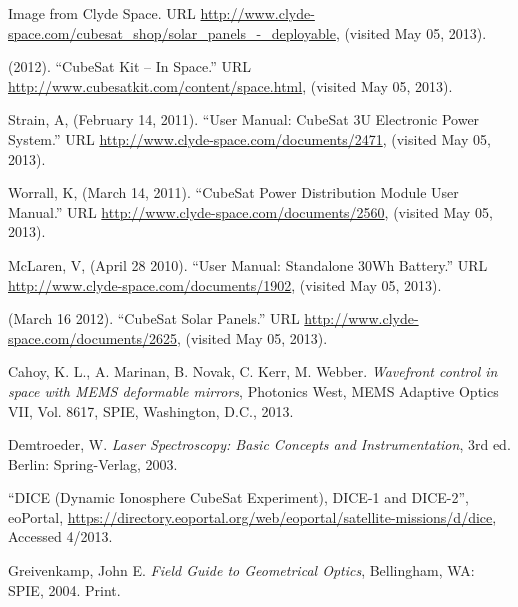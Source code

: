 \documentclass[12pt]{article}
\begin{document}
\begin{thebibliography}{9}








Image from Clyde Space.  URL \url{http://www.clyde-space.com/cubesat_shop/solar_panels_-_deployable}, (visited May 05, 2013).

 (2012).  ``CubeSat Kit -- In Space.''  URL \url{http://www.cubesatkit.com/content/space.html}, (visited May 05, 2013).

 Strain, A, (February 14, 2011).  ``User Manual: CubeSat 3U Electronic Power System.'' URL \url{http://www.clyde-space.com/documents/2471}, (visited May 05, 2013).

 Worrall, K, (March 14, 2011).  ``CubeSat Power Distribution Module User Manual.'' URL \url{http://www.clyde-space.com/documents/2560}, (visited May 05, 2013).

 McLaren, V, (April 28 2010).  ``User Manual: Standalone 30Wh Battery.''  URL \url{http://www.clyde-space.com/documents/1902}, (visited May 05, 2013).

 (March 16 2012). ``CubeSat Solar Panels.''  URL \url{http://www.clyde-space.com/documents/2625}, (visited May 05, 2013).



   Cahoy, K. L., A. Marinan, B. Novak, C. Kerr, M. Webber. 
   \emph{Wavefront control in space with MEMS deformable mirrors}, Photonics West, MEMS Adaptive Optics VII, Vol. 8617, SPIE, Washington, D.C., 2013.
 
   Demtroeder, W.
   \emph{Laser Spectroscopy: Basic Concepts and Instrumentation}, 3rd ed. Berlin: Spring-Verlag, 2003.

“DICE (Dynamic Ionosphere CubeSat Experiment), DICE-1 and DICE-2”, eoPortal, \url{https://directory.eoportal.org/web/eoportal/satellite-missions/d/dice}, Accessed 4/2013.

   Greivenkamp, John E. 
   \emph{Field Guide to Geometrical Optics}, Bellingham, WA: SPIE, 2004. Print.


\end{thebibliography}
\end{document}
